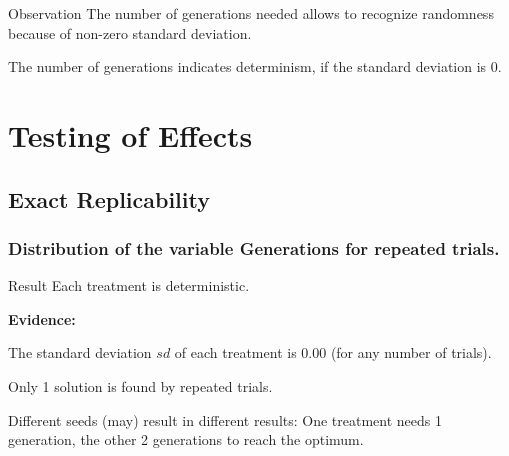 \documentclass[18pt,c]{beamer}
\begin{document}
\begin{frame}
\vspace*{2mm}
\begin{block}{
Observation
}
The number of generations needed allows to recognize randomness
because of non-zero standard deviation.
 
The number of generations indicates determinism,
if the standard deviation is $0$.
\end{block}
\end{frame}%
\clearpage
\section{Testing of Effects}
\subsection{Exact Replicability}
 \begin{frame}
 \fontsize{8pt}{9pt}\selectfont
 \frametitle{ Distribution of the variable Generations for repeated trials. }

 \label{ExpCStatsTable003.tex}  
 \end{frame}

\begin{frame}
\vspace*{2mm}
\begin{block}{
Result
}
Each treatment is deterministic.
 
{\bf Evidence:}
 
The standard deviation $sd$ of each treatment is $0.00$
(for any number of trials).
 
Only 1 solution is found by repeated trials.
 
Different seeds (may) result in different results:
One treatment needs 1 generation, the other 2 generations to reach the optimum.
\end{block}
\end{frame}%
\end{document}
